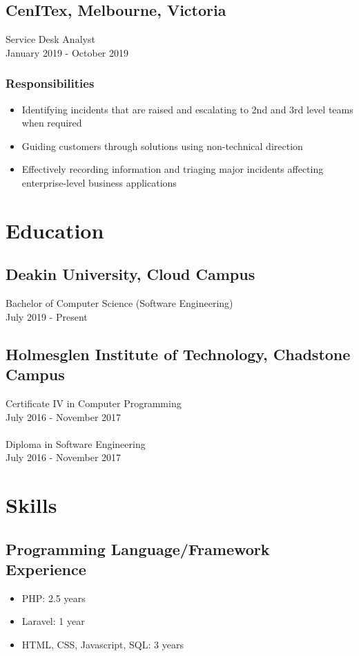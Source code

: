 \documentclass[a4paper, 10pt]{article}
\begin{document}
	\subsection*{CenITex, Melbourne, Victoria}
		Service Desk Analyst\\
		January 2019 - October 2019
	\subsubsection*{Responsibilities}
	\begin{itemize}
		\item Identifying incidents that are raised and escalating to 2nd and 3rd level teams when required
		\item Guiding customers through solutions using non-technical direction
		\item Effectively recording information and triaging major incidents affecting enterprise-level business applications 
	\end{itemize}
	\section*{Education}
	\subsection*{Deakin University, Cloud Campus}
		Bachelor of Computer Science (Software Engineering)\\
		July 2019 - Present
	\subsection*{Holmesglen Institute of Technology, Chadstone Campus}
		Certificate IV in Computer Programming\\
		July 2016 - November 2017\\	
	\\
		Diploma in Software Engineering\\
		July 2016 - November 2017
	\section*{Skills}
	\subsection*{Programming Language/Framework Experience}
	\begin{itemize}
		\item PHP: 2.5 years
		\item Laravel: 1 year
		\item HTML, CSS, Javascript, SQL: 3 years
	\end{itemize}
\end{document}
